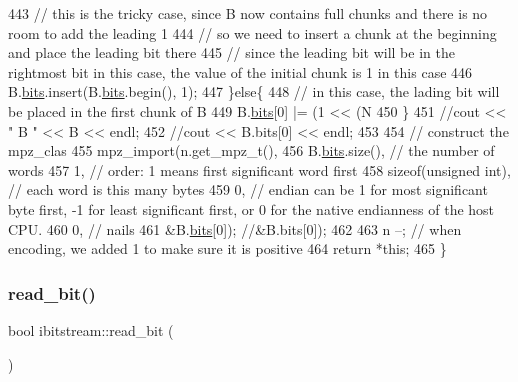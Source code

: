 \begin{DoxyCode}
443     \textcolor{comment}{// this is the tricky case, since B now contains full chunks and there is no room to add the leading 1}
444     \textcolor{comment}{// so we need to insert a chunk at the beginning and place the leading bit there}
445     \textcolor{comment}{// since the leading bit will be in the rightmost bit in this case, the value of the initial chunk is 1
       in this case}
446     B.\hyperlink{classbit__pipe_a86f38af1e9736b053728033490476b50}{bits}.insert(B.\hyperlink{classbit__pipe_a86f38af1e9736b053728033490476b50}{bits}.begin(), 1);
447   \}\textcolor{keywordflow}{else}\{
448     \textcolor{comment}{// in this case, the lading bit will be placed in the first chunk of B}
449     B.\hyperlink{classbit__pipe_a86f38af1e9736b053728033490476b50}{bits}[0] |= (1 << (N %
450   \}
451   \textcolor{comment}{//cout << " B " << B << endl;}
452   \textcolor{comment}{//cout << B.bits[0] << endl;}
453 
454   \textcolor{comment}{// construct the mpz\_clas}
455   mpz\_import(n.get\_mpz\_t(),
456              B.\hyperlink{classbit__pipe_a86f38af1e9736b053728033490476b50}{bits}.size(), \textcolor{comment}{// the number of words}
457              1, \textcolor{comment}{// order: 1 means first significant word first}
458              \textcolor{keyword}{sizeof}(\textcolor{keywordtype}{unsigned} int), \textcolor{comment}{// each word is this many bytes}
459              0, \textcolor{comment}{// endian can be 1 for most significant byte first, -1 for least significant first, or 0
       for the native endianness of the host CPU.}
460              0, \textcolor{comment}{// nails}
461              &B.\hyperlink{classbit__pipe_a86f38af1e9736b053728033490476b50}{bits}[0]); \textcolor{comment}{//&B.bits[0]);}
462 
463   n --; \textcolor{comment}{// when encoding, we added 1 to make sure it is positive}
464   \textcolor{keywordflow}{return} *\textcolor{keyword}{this};
465 \}
\end{DoxyCode}
\mbox{\label{classibitstream_a895239acf7179f6778388c39c97643e4}} 
\subsubsection{\texorpdfstring{read\+\_\+bit()}{read\_bit()}}
{\footnotesize\ttfamily bool ibitstream\+::read\+\_\+bit (\begin{DoxyParamCaption}{ }\end{DoxyParamCaption})}



